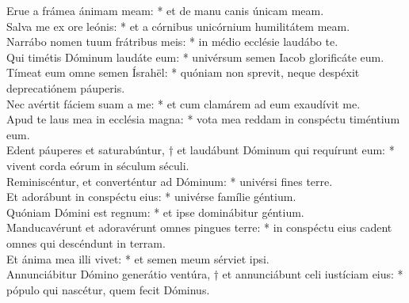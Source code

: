 {	Erue a frámea ánimam meam: * et de manu canis únicam meam. \\
	Salva me ex ore leónis: * et a córnibus unicórnium humilitátem meam. \\
	Narrábo nomen tuum frátribus meis: * in médio ecclésie laudábo te. \\
	Qui timétis Dóminum laudáte eum: * univérsum semen Iacob glorificáte eum. \\
	Tímeat eum omne semen Ísrahël: * quóniam non sprevit, neque despéxit deprecatiónem páuperis. \\
	Nec avértit fáciem suam a me: * et cum clamárem ad eum exaudívit me. \\
	Apud te laus mea in ecclésia magna: * vota mea reddam in conspéctu timéntium eum. \\
	Edent páuperes et saturabúntur, † et laudábunt Dóminum qui requírunt eum: * vivent corda eórum in séculum séculi. \\
	Reminiscéntur, et converténtur ad Dóminum: * univérsi fines terre. \\
	Et adorábunt in conspéctu eius: * univérse famílie géntium. \\
	Quóniam Dómini est regnum: * et ipse dominábitur géntium. \\
	Manducavérunt et adoravérunt omnes pingues terre: * in conspéctu eius cadent omnes qui descéndunt in terram. \\
	Et ánima mea illi vivet: * et semen meum sérviet ipsi. \\
	Annunciábitur Dómino generátio ventúra, † et annunciábunt celi iustíciam eius: * pópulo qui nascétur, quem fecit Dóminus.
}


